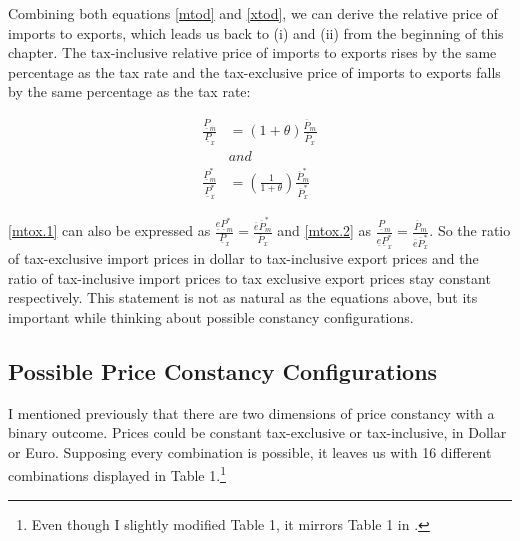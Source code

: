 Combining both equations \eqref{mtod} and \eqref{xtod}, we can derive the relative price of imports to exports, which leads us back to (i) and (ii) from the beginning of this chapter. 
The tax-inclusive relative price of imports to exports rises by the same percentage as the tax rate and the tax-exclusive price of imports to exports falls by the same percentage as the tax rate: 

\begin{align}
    \frac{\underline P_m}{\underline P_x} &= (1+\theta)\frac{\overline P_m}{\overline P_x} \label{mtox.1} \\
    &and \nonumber \\
    \frac{\underline P_m^*}{\underline P_x^*} &= \left(\frac{1}{1+\theta}\right)\frac{\overline P_m^*}{\overline P_x^*} \label{mtox.2}
\end{align}

\eqref{mtox.1} can also be expressed as $\frac{\underline e \underline P_m^*}{\underline P_x} = \frac{\overline e \overline P_m^*}{\overline P_x}$ and \eqref{mtox.2} as $\frac{\underline P_m}{\underline e \underline P_x^*} = \frac{\overline P_m}{\overline e \overline P_x^*}$. So the ratio of tax-exclusive import prices in dollar to tax-inclusive export prices and the ratio of tax-inclusive import prices to tax exclusive export prices stay constant respectively. This statement is not as natural as the equations above, but its important while thinking about possible constancy configurations.

\subsection{Possible Price Constancy Configurations}
I mentioned previously that there are two dimensions of price constancy with a binary outcome. Prices could be constant tax-exclusive or tax-inclusive, in Dollar or Euro. Supposing every combination is possible, it leaves us with 16 different combinations displayed in Table 1.\footnote{Even though I slightly modified Table 1, it mirrors Table 1 in \cite{buiter2017exchange}. } 


